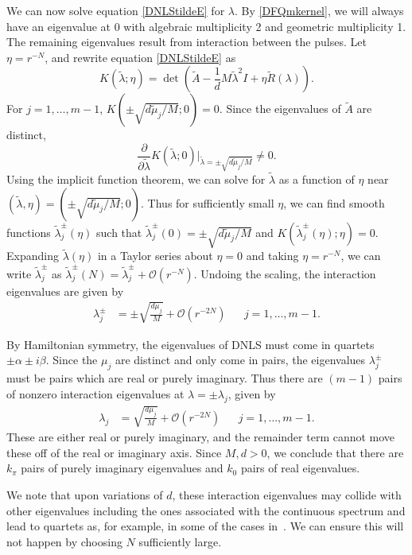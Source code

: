 \documentclass[12pt]{elsarticle}
\begin{document}
We can now solve equation \cref{DNLStildeE} for $\lambda$. By \cref{DFQmkernel}, we will always have an eigenvalue at 0 with algebraic multiplicity 2 and geometric multiplicity 1. The remaining eigenvalues result from interaction between the pulses. Let $\eta = r^{-N}$, and rewrite equation \cref{DNLStildeE} as 
\begin{equation}\label{DNLStildeE2}
K(\tilde{\lambda}; \eta) = \det\left(\tilde{A} - \frac{1}{d}M \tilde{\lambda}^2 I + \eta \tilde{R}(\lambda)\right).
\end{equation}
For $j = 1, \dots, m-1$, $K(\pm \sqrt{d \tilde{\mu}_j / M }; 0) = 0$. Since the eigenvalues of $\tilde{A}$ are distinct, 
\[
\frac{\partial}{\partial \tilde{\lambda}} K(\tilde{\lambda}; 0)\Big|_{\tilde{\lambda} = \pm \sqrt{d \tilde{\mu}_j / M }} \neq 0.
\]
Using the implicit function theorem, we can solve for $\tilde{\lambda}$ as a function of $\eta$ near $(\tilde{\lambda}, \eta) = (\pm \sqrt{d \tilde{\mu}_j / M }; 0)$. Thus for sufficiently small $\eta$, we can find smooth functions $\tilde{\lambda}_j^\pm(\eta)$ such that $\tilde{\lambda}_j^\pm(0) = \pm \sqrt{d \tilde{\mu}_j / M }$ and $K(\tilde{\lambda}_j^\pm(\eta); \eta) = 0$. Expanding $\tilde{\lambda}(\eta)$ in a Taylor series about $\eta = 0$ and taking $\eta = r^{-N}$, we can write $\tilde{\lambda}_j^\pm$ as $\tilde{\lambda}_j^\pm(N) = \tilde{\lambda}_j^\pm + \mathcal{O}(r^{-N})$. Undoing the scaling, the interaction eigenvalues are given by
\begin{align*}
\lambda^\pm_j &= \pm \sqrt{\frac{d \mu_j}{M}} + \mathcal{O}(r^{-2N}) && j = 1, \dots, m-1 .
\end{align*}

By Hamiltonian symmetry, the eigenvalues of DNLS must come in quartets $\pm \alpha \pm i \beta$. Since the $\mu_j$ are distinct and only come in pairs, the eigenvalues $\lambda_j^\pm$ must be pairs which are real or purely imaginary. Thus there are $(m - 1)$ pairs of nonzero interaction eigenvalues at $\lambda = \pm \lambda_j$, given by 
\begin{align*}
\lambda_j &= \sqrt{\frac{d \mu_j}{M}} + \mathcal{O}(r^{-2N}) && j = 1, \dots, m-1.
\end{align*}
These are either real or purely imaginary, and the remainder term cannot move these off of the real or imaginary axis. Since $M, d > 0$, we conclude that there are $k_\pi$ pairs of purely imaginary eigenvalues and $k_0$ pairs of real eigenvalues.

We note that upon variations of $d$,
these interaction eigenvalues may collide with other eigenvalues including
the ones associated with the continuous spectrum
and lead to quartets as, for example, in some of the
cases in~\cite{Pelinovsky2005}. We can ensure this will not happen by choosing $N$ sufficiently large.
\end{document}
